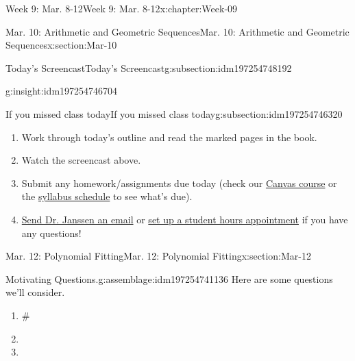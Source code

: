 \documentclass[oneside,10pt,]{book}
\numberwithin{equation}{section}
\newlength{\previewwidth}
\begin{document}
\begin{chapterptx}{Week 9: Mar. 8-12}{}{Week 9: Mar. 8-12}{}{}{x:chapter:Week-09}
\begin{sectionptx}{Mar. 10: Arithmetic and Geometric Sequences}{}{Mar. 10: Arithmetic and Geometric Sequences}{}{}{x:section:Mar-10}
\begin{subsectionptx}{Today's Screencast}{}{Today's Screencast}{}{}{g:subsection:idm197254748192}
\begin{insight}{}{g:insight:idm197254746704}
\begin{tcbraster}[raster columns=2, raster column skip=1pt, raster halign=center, raster force size=false, raster left skip=0pt, raster right skip=0pt]
\begin{tcolorbox}[previewstyle, width=\previewwidth]
\end{tcolorbox}%
\begin{tcolorbox}[qrstyle]%
[QR LINK]\end{tcolorbox}%
\end{tcbraster}%
\end{insight}
\end{subsectionptx}
%
%
\typeout{************************************************}
\typeout{************************************************}
%
\begin{subsectionptx}{If you missed class today}{}{If you missed class today}{}{}{g:subsection:idm197254746320}
%
\begin{enumerate}
\item{}Work through today's outline and read the marked pages in the book.%
\item{}Watch the screencast above.%
\item{}Submit any homework\slash{}assignments due today (check our \href{https://dordt.instructure.com/courses/3110050}{Canvas course} or the \href{https://prof.mkjanssen.org/ds/index.html\#schedule}{syllabus schedule} to see what's due).%
\item{}\href{mailto:mike.janssen@dordt.edu}{Send Dr. Janssen an email} or \href{https://calendly.com/mkjanssen/student-hours}{set up a student hours appointment} if you have any questions!%
\end{enumerate}
\end{subsectionptx}
\end{sectionptx}
%
%
\typeout{************************************************}
\typeout{************************************************}
%
\begin{sectionptx}{Mar. 12: Polynomial Fitting}{}{Mar. 12: Polynomial Fitting}{}{}{x:section:Mar-12}
\begin{introduction}{}%
\begin{assemblage}{Motivating Questions.}{g:assemblage:idm197254741136}%
Here are some questions we'll consider. %
\begin{enumerate}
\item{}\#%
\item{}%
\item{}%
\end{enumerate}
%
\end{assemblage}
\end{introduction}%
%
%
\typeout{************************************************}

\end{sectionptx}
\end{chapterptx}
\end{document}
